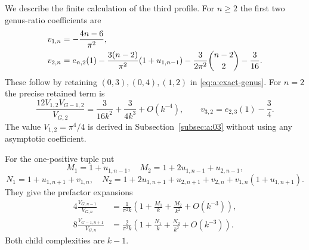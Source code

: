 \documentclass[a4paper,10pt]{article}
\numberwithin{equation}{section}
\theoremstyle{paperplain}
\theoremstyle{paperremark}
\theoremstyle{paperplain}
\begin{document}
We describe the finite calculation of the third profile.
For $n\geq2$ the first two genus-ratio coefficients are
\begin{align}
 v_{1,n}&=-\frac{4n-6}{\pi^2},\notag\\
 v_{2,n}&=e_{n,2}(1)
 -\frac{3(n-2)}{\pi^2}(1+u_{1,n-1})
 -\frac{3}{2\pi^2}\binom{n-2}{2}-\frac3{16}.
 \label{eq:a:genus-first-two}
\end{align}
These follow by retaining $(0,3),(0,4),(1,2)$ in
\eqref{eq:a:exact-genus}. For $n=2$ the precise retained term is
\begin{equation}\label{eq:a:genus-small-split}
 \frac{12V_{1,2}V_{G-1,2}}{V_{G,2}}
   =\frac3{16k^2}+\frac3{4k^3}+O(k^{-4}),\qquad
 v_{3,2}=e_{2,3}(1)-\frac34.
\end{equation}
The value $V_{1,2}=\pi^4/4$ is derived in
Subsection~\ref{subsec:a:03} without using any asymptotic coefficient.

For the one-positive tuple put
\[
 M_1=1+u_{1,n-1},\quad M_2=1+2u_{1,n-1}+u_{2,n-1},
\]
\[
 N_1=1+u_{1,n+1}+v_{1,n},\quad
 N_2=1+2u_{1,n+1}+u_{2,n+1}+v_{2,n}
                              +v_{1,n}(1+u_{1,n+1}).
\]
They give the prefactor expansions
\begin{align*}
 4\frac{V_{G,n-1}}{V_{G,n}}
 &=\frac1{\pi^2k}\left(1+\frac{M_1}{k}+\frac{M_2}{k^2}
                                      +O(k^{-3})\right),\\
 8\frac{V_{G-1,n+1}}{V_{G,n}}
 &=\frac2{\pi^2k}\left(1+\frac{N_1}{k}+\frac{N_2}{k^2}
                                      +O(k^{-3})\right).
\end{align*}
Both child complexities are $k-1$.
\end{document}
